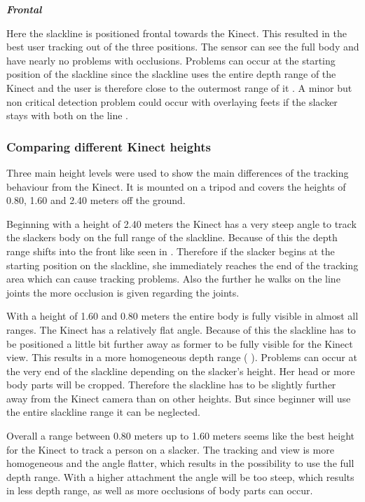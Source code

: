 \textit{\textbf{Frontal}}

Here the slackline is positioned frontal towards the Kinect. This resulted in the best user tracking out of the three positions. The sensor can see the full body and have nearly no problems with occlusions. Problems can occur at the starting position of the slackline since the slackline uses the entire depth range of the Kinect and the user is therefore close to the outermost range of it \textbf{}.  A minor but non critical detection problem could occur with overlaying feets if the slacker stays with both on the line \textbf{}.

\subsubsection{Comparing different Kinect heights}
Three main height levels were used to show the main differences of the tracking behaviour from the Kinect. It is mounted on a tripod and covers the heights of 0.80, 1.60 and 2.40 meters off the ground. 

Beginning with a height of 2.40 meters the Kinect has a very steep angle to track the slackers body on the full range of the slackline. Because of this the depth range shifts into the front like seen in \textbf{}. Therefore if the slacker begins at the starting position on the slackline, she immediately reaches the end of the tracking area which can cause tracking problems. Also the further he walks on the line joints the more occlusion is given regarding the joints.

With a height of 1.60 and 0.80 meters the entire body is fully visible in almost all ranges. The Kinect has a relatively flat angle. Because of this the slackline has to be positioned a little bit further away as former to be fully visible for the Kinect view. This results in a more homogeneous depth range ( \textbf{}). Problems can occur at the very end of the slackline depending on the slacker’s height. Her head or more body parts will be cropped. Therefore the slackline has to be slightly further away from the Kinect camera than on other heights. But since beginner will use the entire slackline range it can be neglected.

Overall a range between 0.80 meters up to 1.60 meters seems like the best height for the Kinect to track a person on a slacker. The tracking and view is more homogeneous and the angle flatter, which results in the possibility to use the full depth range. With a higher attachment the angle will be too steep, which results in less depth range, as well as more occlusions of body parts can occur.

